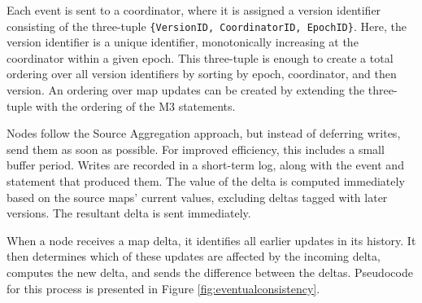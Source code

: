 \documentclass{vldb}
\begin{document}
Each event is sent to a coordinator, where it is assigned a version identifier consisting of the three-tuple \texttt{\{VersionID, CoordinatorID, EpochID\}}.  Here, the version identifier is a unique identifier, monotonically increasing at the coordinator within a given epoch.  This three-tuple is enough to create a total ordering over all version identifiers by sorting by epoch, coordinator, and then version.  An ordering over map updates can be created by extending the three-tuple with the ordering of the M3 statements.  

Nodes follow the Source Aggregation approach, but instead of deferring writes, send them as soon as possible.  For improved efficiency, this includes a small buffer period.  Writes are recorded in a short-term log, along with the event and statement that produced them.  The value of the delta is computed immediately based on the source maps' current values, excluding deltas tagged with later versions.  The resultant delta is sent immediately.  

When a node receives a map delta, it identifies all earlier updates in its history.  It then determines which of these updates are affected by the incoming delta, computes the new delta, and sends the difference between the deltas.  Pseudocode for this process is presented in Figure \ref{fig:eventualconsistency}.
\end{document}
